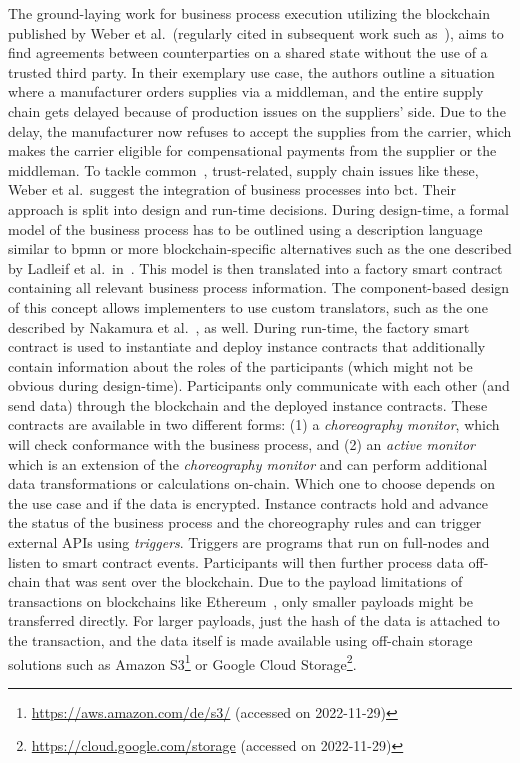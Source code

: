 The ground-laying work for business process execution utilizing the blockchain published by Weber et al.\ (regularly cited in subsequent work such as~\cite{runtime_verification_for_bp_utilizing_bitcoin,bo_collaboration_between_healthcare_providers_covid_19,caterpillar_blockchain_based_bpm_system,modeling_blockchain_based_choreographies,blockchain_based_information_sharing_in_io_workflows}), aims to find agreements between counterparties on a shared state without the use of a trusted third party. In their exemplary use case, the authors outline a situation where a manufacturer orders supplies via a middleman, and the entire supply chain gets delayed because of production issues on the suppliers' side. Due to the delay, the manufacturer now refuses to accept the supplies from the carrier, which makes the carrier eligible for compensational payments from the supplier or the middleman. To tackle common~\cite{impact_of_trust_on_supply_chains}, trust-related, supply chain issues like these, Weber et al.\ suggest the integration of business processes into \gls{bct}. Their approach is split into design and run-time decisions. During design-time, a formal model of the business process has to be outlined using a description language similar to \gls{bpmn} or more blockchain-specific alternatives such as the one described by Ladleif et al.\ in~\cite{modeling_blockchain_based_choreographies}. This model is then translated into a factory smart contract containing all relevant business process information. The component-based design of this concept allows implementers to use custom translators, such as the one described by Nakamura et al.~\cite{inter_organizational_bps_managed_by_blockchain}, as well. During run-time, the factory smart contract is used to instantiate and deploy instance contracts that additionally contain information about the roles of the participants (which might not be obvious during design-time). Participants only communicate with each other (and send data) through the blockchain and the deployed instance contracts. These contracts are available in two different forms: (1) a \textit{choreography monitor}, which will check conformance with the business process, and (2) an \textit{active monitor} which is an extension of the \textit{choreography monitor} and can perform additional data transformations or calculations on-chain. Which one to choose depends on the use case and if the data is encrypted. Instance contracts hold and advance the status of the business process and the choreography rules and can trigger external APIs using \textit{triggers}. Triggers are programs that run on full-nodes and listen to smart contract events. Participants will then further process data off-chain that was sent over the blockchain. Due to the payload limitations of transactions on blockchains like Ethereum~\cite{ethereum_yellow_paper}, only smaller payloads might be transferred directly. For larger payloads, just the hash of the data is attached to the transaction, and the data itself is made available using off-chain storage solutions such as Amazon S3\footnote{\url{https://aws.amazon.com/de/s3/} (accessed on 2022-11-29)} or Google Cloud Storage\footnote{\url{https://cloud.google.com/storage} (accessed on 2022-11-29)}.

